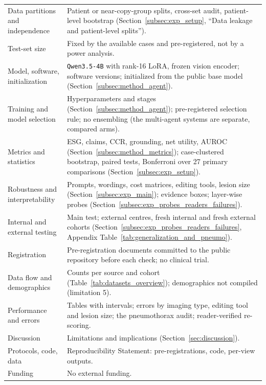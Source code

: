 \documentclass{article} %
\begin{document}
\begin{table}[h]
\begin{center}
\begin{adjustbox}{max width=\linewidth}
\begin{tabular}{L{3.6cm}L{9.6cm}}
Data partitions and independence & Patient or near-copy-group splits, cross-set audit, patient-level bootstrap (Section~\ref{subsec:exp_setup}, ``Data leakage and patient-level splits''). \\
Test-set size & Fixed by the available cases and pre-registered, not by a power analysis. \\
Model, software, initialization & \texttt{Qwen3.5-4B} with rank-16 LoRA, frozen vision encoder; software versions; initialized from the public base model (Section~\ref{subsec:method_agent}). \\
Training and model selection & Hyperparameters and stages (Section~\ref{subsec:method_agent}); pre-registered selection rule; no ensembling (the multi-agent systems are separate, compared arms). \\
Metrics and statistics & ESG, claims, CCR, grounding, net utility, AUROC (Section~\ref{subsec:method_metrics}); case-clustered bootstrap, paired tests, Bonferroni over 27 primary comparisons (Section~\ref{subsec:exp_setup}). \\
Robustness and interpretability & Prompts, wordings, cost matrices, editing tools, lesion size (Section~\ref{subsec:exp_main}); evidence boxes; layer-wise probes (Section~\ref{subsec:exp_probes_readers_failures}). \\
Internal and external testing & Main test; external centres, fresh internal and fresh external cohorts (Section~\ref{subsec:exp_probes_readers_failures}, Appendix Table~\ref{tab:generalization_and_pneumo}). \\
Registration & Pre-registration documents committed to the public repository before each check; no clinical trial. \\
Data flow and demographics & Counts per source and cohort (Table~\ref{tab:datasets_overview}); demographics not compiled (limitation 5). \\
Performance and errors & Tables with intervals; errors by imaging type, editing tool and lesion size; the pneumothorax audit; reader-verified re-scoring. \\
Discussion & Limitations and implications (Section~\ref{sec:discussion}). \\
Protocols, code, data & Reproducibility Statement: pre-registrations, code, per-view outputs. \\
Funding & No external funding. \\
\bottomrule
\end{tabular}
\end{adjustbox}
\end{center}
\end{table}
\end{document}
